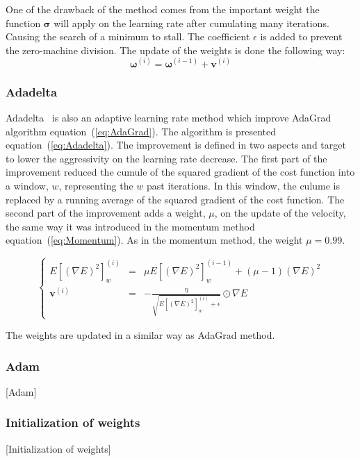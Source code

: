 \documentclass[final, paper=letter,5p,times,twocolumn]{elsarticle}
\begin{document}
One of the drawback of the method comes from the important weight the function $\bm{\sigma}$ will apply on the learning rate after cumulating many iterations. Causing the search of a minimum to stall. The coefficient $\epsilon$ is added to prevent the zero-machine division. The update of the weights is done the following way:
\begin{equation*}
\bm{\omega}^{(i)} = \bm{\omega}^{(i-1)} + \bm{v}^{(i)}
\end{equation*}

\subsubsection{Adadelta}
Adadelta~\cite{DBLP:abs-1212-5701} is also an adaptive learning rate method which improve AdaGrad algorithm equation~(\ref{eq:AdaGrad}). The algorithm is presented equation~(\ref{eq:Adadelta}). The improvement is defined in two aspects and target to lower the aggressivity on the learning rate decrease. The first part of the improvement reduced the cumule of the squared gradient of the cost function into a window, $w$, representing the $w$ past iterations. In this window, the culume is replaced by a running average of the squared gradient of the cost function. The second part of the improvement adds a weight, $\mu$, on the update of the velocity, the same way it was introduced in the momentum method equation~(\ref{eq:Momentum}). As in the momentum method, the weight $\mu = 0.99$.

\begin{equation}
\left\lbrace
\begin{array}{ccc}
  E[(\nabla E)^{2}]_{w}^{(i)} & = & \mu E[(\nabla E)^{2}]_{w}^{(i-1)} + (\mu - 1)(\nabla E)^{2} \\
  \bm{v}^{(i)}              & = & -\frac{\eta}{\sqrt{E[(\nabla E)^{2}]_{w}^{(i)} + \epsilon}} \odot \nabla E
\end{array}
\right.
\label{eq:Adadelta}
\end{equation}

The weights are updated in a similar way as AdaGrad method.

\subsubsection{Adam}
[Adam]

\subsubsection{Initialization of weights}
[Initialization of weights]
\end{document}
